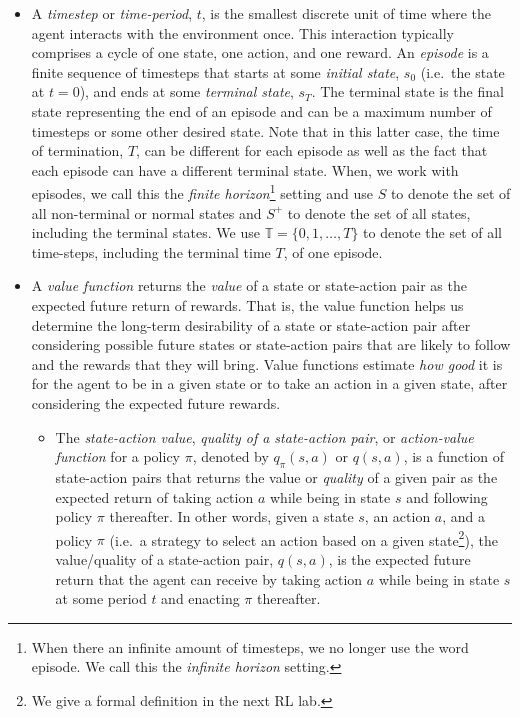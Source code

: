 \begin{itemize}
    \item A \emph{timestep} or \emph{time-period}, $t$, is the smallest discrete unit of time where the agent interacts with the environment once.
    This interaction typically comprises a cycle of one state, one action, and one reward.
    An \emph{episode} is a finite sequence of timesteps that starts at some \emph{initial state}, $s_0$ (i.e.\ the state at $t=0$), and ends at some \emph{terminal state}, $s_T$.
    The terminal state is the final state representing the end of an episode and can be a maximum number of timesteps or some other desired state.
    Note that in this latter case, the time of termination, $T$, can be different for each episode as well as the fact that each episode can have a different terminal state.
    When, we work with episodes, we call this the \emph{finite horizon}\footnote{When there an infinite amount of timesteps, we no longer use the word episode. We call this the \emph{infinite horizon} setting.} setting and use $S$ to denote the set of all non-terminal or normal states and $S^+$ to denote the set of all states, including the terminal states.
    We use $\mathbb{T}=\{0, 1,\ldots,T\}$ to denote the set of all time-steps, including the terminal time $T$, of one episode.

    \item A \emph{value function} returns the \emph{value} of a state or state-action pair as the expected future return of rewards.
    That is, the value function helps us determine the long-term desirability of a state or state-action pair after considering possible future states or state-action pairs that are likely to follow and the rewards that they will bring.
    Value functions estimate \emph{how good} it is for the agent to be in a given state or to take an action in a given state, after considering the expected future rewards.
    \begin{itemize}
        \item The \emph{state-action value}, \emph{quality of a state-action pair}, or \emph{action-value function} for a policy $\pi$, denoted by $q_\pi(s,a)$ or $q(s,a)$, is a function of state-action pairs that returns the value or \emph{quality} of a given pair as the expected return of taking action $a$ while being in state $s$ and following policy $\pi$ thereafter.
        In other words, given a state $s$, an action $a$, and a policy $\pi$ (i.e.\ a strategy to select an action based on a given state\footnote{We give a formal definition in the next RL lab.}), the value/quality of a state-action pair, $q(s,a)$, is the expected future return that the agent can receive by taking action $a$ while being in state $s$ at some period $t$ and enacting $\pi$ thereafter.
    \end{itemize}
\end{itemize}

